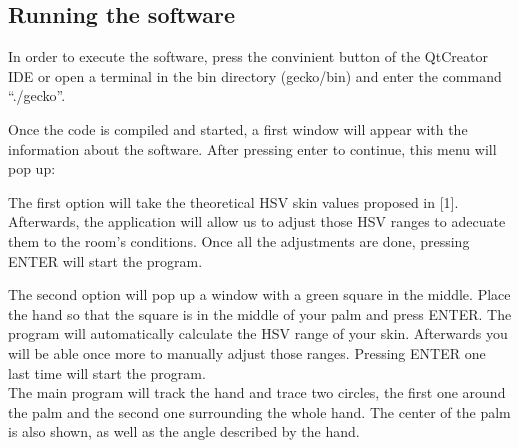 \subsection{Running the software}

In order to execute the software, press the convinient button of the QtCreator IDE or open a terminal in the bin directory (gecko/bin) and enter the command ``./gecko''. 

Once the code is compiled and started, a first window will appear with the information about the software. After pressing enter to continue, this menu will pop up: 
\begin{center}
\end{center}

\vspace{1cm}
The first option will take the theoretical HSV skin values proposed in [1]. Afterwards, the application will allow us to adjust those HSV ranges to adecuate them to the room's conditions. 
Once all the adjustments are done, pressing ENTER will start the program. 

The second option will pop up a window with a green square in the middle. Place the hand so that the square is in the middle of your palm and press ENTER. The program will automatically calculate the HSV range of your skin. Afterwards you will be able once more to manually adjust those ranges. Pressing ENTER one last time will start the program. 
\\
 
The main program will track the hand and trace two circles, the first one around the palm and the second one surrounding the whole hand. The center of the palm is also shown, as well as the angle described by the hand. 

